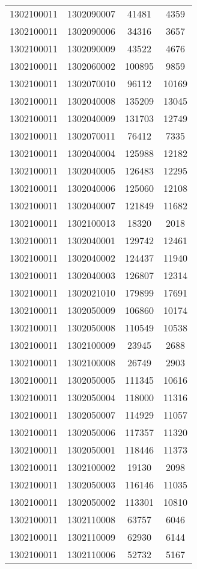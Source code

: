 \begin{longtable}{llcc}
1302100011 & 1302090007 & 41481 & 4359\\
1302100011 & 1302090006 & 34316 & 3657\\
1302100011 & 1302090009 & 43522 & 4676\\
1302100011 & 1302060002 & 100895 & 9859\\
1302100011 & 1302070010 & 96112 & 10169\\
1302100011 & 1302040008 & 135209 & 13045\\
1302100011 & 1302040009 & 131703 & 12749\\
1302100011 & 1302070011 & 76412 & 7335\\
1302100011 & 1302040004 & 125988 & 12182\\
1302100011 & 1302040005 & 126483 & 12295\\
1302100011 & 1302040006 & 125060 & 12108\\
1302100011 & 1302040007 & 121849 & 11682\\
1302100011 & 1302100013 & 18320 & 2018\\
1302100011 & 1302040001 & 129742 & 12461\\
1302100011 & 1302040002 & 124437 & 11940\\
1302100011 & 1302040003 & 126807 & 12314\\
1302100011 & 1302021010 & 179899 & 17691\\
1302100011 & 1302050009 & 106860 & 10174\\
1302100011 & 1302050008 & 110549 & 10538\\
1302100011 & 1302100009 & 23945 & 2688\\
1302100011 & 1302100008 & 26749 & 2903\\
1302100011 & 1302050005 & 111345 & 10616\\
1302100011 & 1302050004 & 118000 & 11316\\
1302100011 & 1302050007 & 114929 & 11057\\
1302100011 & 1302050006 & 117357 & 11320\\
1302100011 & 1302050001 & 118446 & 11373\\
1302100011 & 1302100002 & 19130 & 2098\\
1302100011 & 1302050003 & 116146 & 11035\\
1302100011 & 1302050002 & 113301 & 10810\\
1302100011 & 1302110008 & 63757 & 6046\\
1302100011 & 1302110009 & 62930 & 6144\\
1302100011 & 1302110006 & 52732 & 5167\\

\end{longtable}
